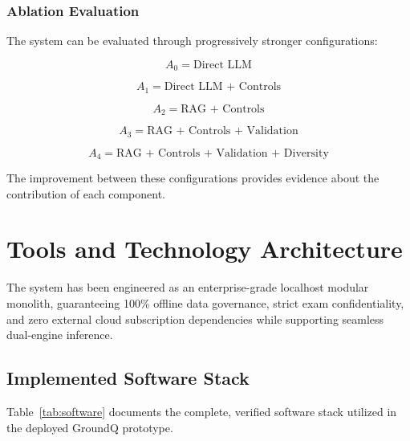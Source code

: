 \documentclass[12pt,a4paper]{report}
\begin{document}
\subsection{Ablation Evaluation}

The system can be evaluated through progressively stronger configurations:

\[
A_0 = \text{Direct LLM}
\]

\[
A_1 = \text{Direct LLM + Controls}
\]

\[
A_2 = \text{RAG + Controls}
\]

\[
A_3 = \text{RAG + Controls + Validation}
\]

\[
A_4 = \text{RAG + Controls + Validation + Diversity}
\]

The improvement between these configurations provides evidence about the contribution of each component.



\chapter{Tools and Technology Architecture}

The system has been engineered as an enterprise-grade localhost modular monolith, guaranteeing 100\% offline data governance, strict exam confidentiality, and zero external cloud subscription dependencies while supporting seamless dual-engine inference.

\section{Implemented Software Stack}

Table~\ref{tab:software} documents the complete, verified software stack utilized in the deployed GroundQ prototype.
\end{document}
